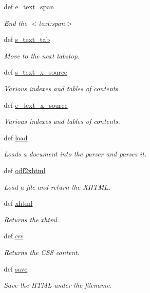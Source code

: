 \begin{DoxyCompactItemize}
def \hyperlink{classodf_1_1odf2xhtml_1_1ODF2XHTML_a9d856aad6a3d0aca6eeaaff9eca1834a}{e\+\_\+text\+\_\+span}
\begin{DoxyCompactList}\small\item\em End the $<$text\+:span$>$ \end{DoxyCompactList}\item 
def \hyperlink{classodf_1_1odf2xhtml_1_1ODF2XHTML_a419f71e7624cb50efa207e7bd3d0f8ca}{s\+\_\+text\+\_\+tab}
\begin{DoxyCompactList}\small\item\em Move to the next tabstop. \end{DoxyCompactList}\item 
def \hyperlink{classodf_1_1odf2xhtml_1_1ODF2XHTML_ab28c3de247ce491898490f01ea677a97}{s\+\_\+text\+\_\+x\+\_\+source}
\begin{DoxyCompactList}\small\item\em Various indexes and tables of contents. \end{DoxyCompactList}\item 
def \hyperlink{classodf_1_1odf2xhtml_1_1ODF2XHTML_a25aa004a2e8b7b3832af1d8794e2c797}{e\+\_\+text\+\_\+x\+\_\+source}
\begin{DoxyCompactList}\small\item\em Various indexes and tables of contents. \end{DoxyCompactList}\item 
def \hyperlink{classodf_1_1odf2xhtml_1_1ODF2XHTML_a33674047bdb1e09e4a63c82ec6f91573}{load}
\begin{DoxyCompactList}\small\item\em Loads a document into the parser and parses it. \end{DoxyCompactList}\item 
def \hyperlink{classodf_1_1odf2xhtml_1_1ODF2XHTML_aad5f96d0cca9639d3dc8166553557427}{odf2xhtml}
\begin{DoxyCompactList}\small\item\em Load a file and return the X\+H\+T\+M\+L. \end{DoxyCompactList}\item 
def \hyperlink{classodf_1_1odf2xhtml_1_1ODF2XHTML_ade09dcddfbaca47ffafa7ab8f305f1b4}{xhtml}
\begin{DoxyCompactList}\small\item\em Returns the xhtml. \end{DoxyCompactList}\item 
def \hyperlink{classodf_1_1odf2xhtml_1_1ODF2XHTML_a35fa261d7ce57bba131d88104caa784a}{css}
\begin{DoxyCompactList}\small\item\em Returns the C\+S\+S content. \end{DoxyCompactList}\item 
def \hyperlink{classodf_1_1odf2xhtml_1_1ODF2XHTML_a8a83f5c682bdbeb1d804ebfe7afbd90f}{save}
\begin{DoxyCompactList}\small\item\em Save the H\+T\+M\+L under the filename. \end{DoxyCompactList}\end{DoxyCompactItemize}
